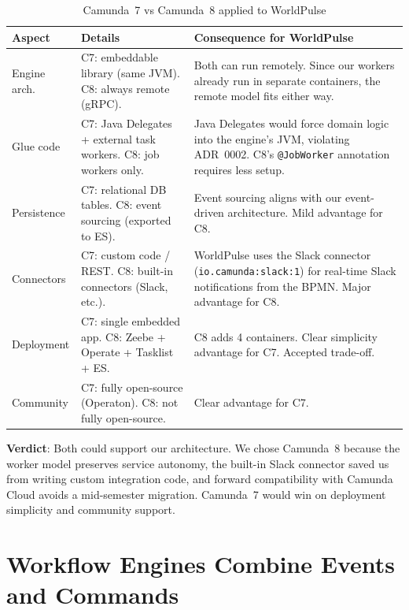 \documentclass[10pt,a4paper]{article}
\begin{document}
\begin{table}[H]
    \centering
    \caption{Camunda~7 vs Camunda~8 applied to WorldPulse}
    \small
    \begin{tabular}{
        >{\raggedright\arraybackslash}p{}
        >{\raggedright\arraybackslash}p{}
        >{\raggedright\arraybackslash}p{}
    }
    \toprule
    \textbf{Aspect} & \textbf{Details} & \textbf{Consequence for WorldPulse} \\
    \midrule
    Engine arch. & C7: embeddable library (same JVM). C8: always remote (gRPC). & Both can run remotely. Since our workers already run in separate containers, the remote model fits either way. \\
    \addlinespace
    Glue code & C7: Java Delegates + external task workers. C8: job workers only. & Java Delegates would force domain logic into the engine's JVM, violating ADR~0002. C8's \texttt{@JobWorker} annotation requires less setup. \\
    \addlinespace
    Persistence & C7: relational DB tables. C8: event sourcing (exported to ES). & Event sourcing aligns with our event-driven architecture. Mild advantage for C8. \\
    \addlinespace
    Connectors & C7: custom code / REST. C8: built-in connectors (Slack, etc.). & WorldPulse uses the Slack connector (\texttt{io.camunda:slack:1}) for real-time Slack notifications from the BPMN. Major advantage for C8. \\
    \addlinespace
    Deployment & C7: single embedded app. C8: Zeebe + Operate + Tasklist + ES. & C8 adds 4 containers. Clear simplicity advantage for C7. Accepted trade-off. \\
    \addlinespace
    Community & C7: fully open-source (Operaton). C8: not fully open-source. & Clear advantage for C7. \\
    \bottomrule
    \end{tabular}
\end{table}

\textbf{Verdict}: Both could support our architecture. We chose Camunda~8 because the worker model preserves service autonomy, the built-in Slack connector saved us from writing custom integration code, and forward compatibility with Camunda Cloud avoids a mid-semester migration. Camunda~7 would win on deployment simplicity and community support.


\section{Workflow Engines Combine Events and Commands}
\end{document}
